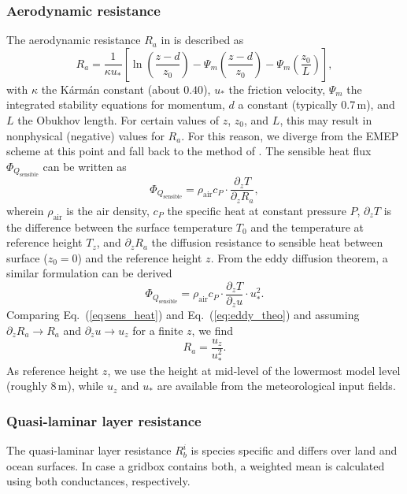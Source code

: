 \documentclass[gmd, manuscript]{copernicus}
\begin{document}
\subsubsection{Aerodynamic resistance}
\label{subsubsec:Ra}
The aerodynamic resistance $R_a$ in \citet{WASP:Simpson2003,ACP:Simpson2012} is described as
\begin{equation}
  R_a = \frac{1}{\kappa u_*}\left[{\ln{\left(\frac{z-d}{z_0}\right)}-\Psi_m\left(\frac{z-d}{z_0}\right)-\Psi_m\left(\frac{z_0}{L}\right)}\right],
\end{equation}
with $\kappa$ the K\'{a}rm\'{a}n constant (about $0.40$), $u_*$ the friction velocity, $\Psi_m$ the integrated stability equations for momentum, $d$ a constant (typically 0.7\,\unit{m}), and $L$ the Obukhov length. For certain values of $z$, $z_0$, and $L$, this may result in nonphysical (negative) values for $R_a$. For this reason, we diverge from the EMEP scheme at this point and fall back to the method of \citet{Monteith1973}.
The sensible heat flux $\Phi_{Q_\text{sensible}}$ can be written as
\begin{equation}
  \Phi_{Q_\text{sensible}} = \rho_\text{air} c_P \cdot \frac{\partial_z T}{\partial_z R_a},
  \label{eq:sens_heat}
\end{equation}
wherein $\rho_\text{air}$ is the air density, $c_P$ the specific heat at constant pressure $P$, $\partial_z T$ is the difference between the surface temperature $T_0$ and the temperature at reference height $T_z$, and $\partial_z R_a$ the diffusion resistance to sensible heat between surface ($z_0 = 0$) and the reference height $z$. From the eddy diffusion theorem, a similar formulation can be derived
\begin{equation}
  \Phi_{Q_\text{sensible}} = \rho_\text{air} c_P \cdot \frac{\partial_z T}{\partial_z u} \cdot u_*^2.
  \label{eq:eddy_theo}
\end{equation}
Comparing Eq.~(\ref{eq:sens_heat}) and Eq.~(\ref{eq:eddy_theo}) and assuming $\partial_z R_a \rightarrow R_a $ and $\partial_z u \rightarrow u_z $ for a finite $z$, we find 
\begin{equation}
  R_a = \frac{u_z}{u_*^2}.
\end{equation}
As reference height $z$, we use the height at mid-level of the lowermost model level (roughly 8\,\unit{m}), while $u_z$ and $u_*$ are available from the meteorological input fields.
\subsubsection{Quasi-laminar layer resistance}
\label{subsubsec:Rb}
The quasi-laminar layer resistance $R_b^i$ is species specific and differs over land and ocean surfaces. In case a gridbox contains both, a weighted mean is calculated using both conductances, respectively.
\end{document}
